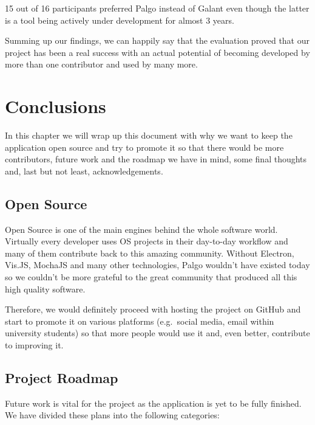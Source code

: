 \documentclass{l4proj}
\begin{document}
15 out of 16 participants preferred Palgo instead of Galant even though the latter is a tool being actively under
development for almost 3 years.

Summing up our findings, we can happily say that the evaluation proved that our project has been a real success with an
actual potential of becoming developed by more than one contributor and used by many more.


\chapter{Conclusions}
\label{conclusions}

In this chapter we will wrap up this document with why we want to keep the application open source and try to promote it
so that there would be more contributors, future work and the roadmap we have in mind, some final thoughts and, last but
not least, acknowledgements.

\section{Open Source}

Open Source is one of the main engines behind the whole software world. Virtually every developer uses OS projects in
their day-to-day workflow and many of them contribute back to this amazing community. Without Electron, Vis.JS, MochaJS
and many other technologies, Palgo wouldn't have existed today so we couldn't be more grateful to the great community
that produced all this high quality software.

Therefore, we would definitely proceed with hosting the project on GitHub and start to promote it on various platforms
(e.g.\ social media, email within university students) so that more people would use it and, even better, contribute to
improving it.

\section{Project Roadmap}

Future work is vital for the project as the application is yet to be fully finished. We have divided these plans into
the following categories:
\end{document}
